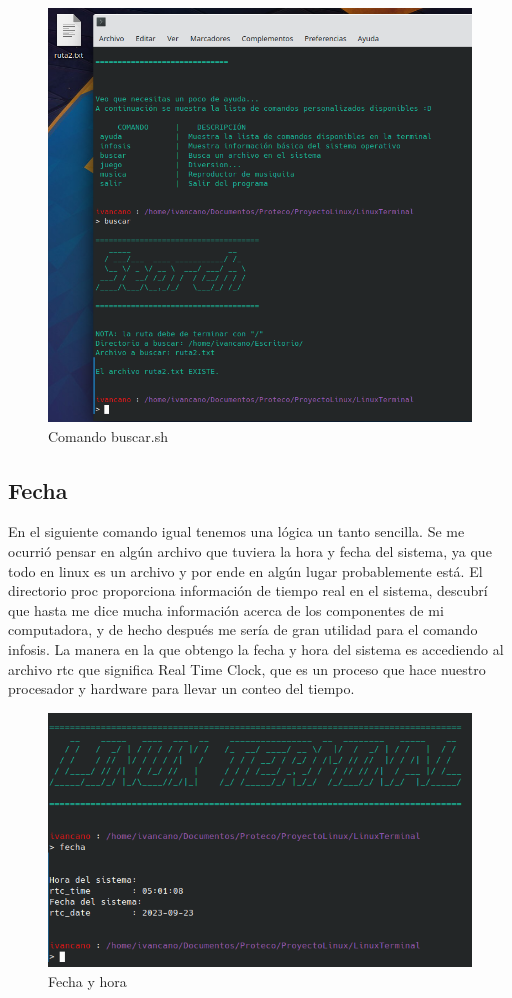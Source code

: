 \documentclass[letter,11pt]{article}
\begin{document}
\begin{figure} [H]
    \centering 
    \caption{Comando buscar.sh}
    \includegraphics[scale=.6]{buscar.png} 
\end{figure}

\subsection{Fecha}
En el siguiente comando igual tenemos una lógica un tanto sencilla. Se me ocurrió pensar en algún archivo que tuviera la hora y fecha del sistema, ya que todo en linux es un archivo y por ende en algún lugar probablemente está. El directorio proc proporciona información de tiempo real en el sistema, descubrí que hasta me dice mucha información acerca de los componentes de mi computadora, y de hecho después me sería de gran utilidad para el comando infosis. La manera en la que obtengo la fecha y hora del sistema es accediendo al archivo rtc que significa Real Time Clock, que es un proceso que hace nuestro procesador y hardware para llevar un conteo del tiempo.

\begin{figure} [H]
    \centering 
    \caption{Fecha y hora}
    \includegraphics[scale=.5]{fecha1.png} 
\end{figure}
\end{document}
